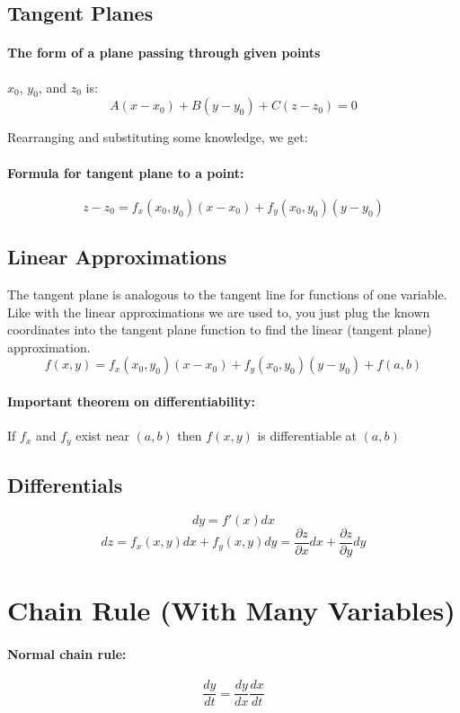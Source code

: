 \documentclass[a4paper,12pt]{report}
\begin{document}
\subsection{Tangent Planes}
\paragraph{The form of a plane passing through given points } $x_0$, $y_0$, and $z_0$ is:
$$A(x-x_0) + B(y-y_0) + C(z-z_0) = 0$$

Rearranging and substituting some knowledge, we get:
\paragraph{Formula for tangent plane to a point: }
$$z - z_0 = f_{x}(x_0, y_0) (x-x_0) + f_y(x_0, y_0)(y-y_0)$$

\subsection{Linear Approximations}
The tangent plane is analogous to the tangent line for functions of one variable. Like with the linear approximations we are used to, you just plug the known coordinates into the tangent plane function to find the linear (tangent plane) approximation.
$$f(x, y) = f_{x}(x_0, y_0)(x-x_0) + f_y(x_0, y_0)(y-y_0) + f(a, b)$$

\paragraph{Important theorem on differentiability: } If $f_x$ and $f_y$ exist near $(a, b)$ then $f(x, y)$ is differentiable at $(a, b)$

\subsection{Differentials}
$$dy = f'(x) dx$$
$$dz = f_x(x, y)dx + f_y(x, y)dy = \frac{\partial z}{\partial x} dx + \frac{\partial z}{\partial y}dy$$

\section{Chain Rule (With Many Variables)}
\paragraph{Normal chain rule: }
$$\frac{dy}{dt} = \frac{dy}{dx} \frac{dx}{dt}$$
\end{document}

